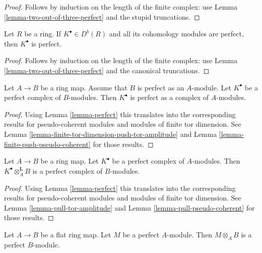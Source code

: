 \begin{proof}
Follows by induction on the length of the finite complex: use
Lemma \ref{lemma-two-out-of-three-perfect}
and the stupid truncations.
\end{proof}

\begin{lemma}
\label{lemma-cohomology-perfect}
Let $R$ be a ring. If $K^\bullet \in D^b(R)$ and all its cohomology
modules are perfect, then $K^\bullet$ is perfect.
\end{lemma}

\begin{proof}
Follows by induction on the length of the finite complex: use
Lemma \ref{lemma-two-out-of-three-perfect}
and the canonical truncations.
\end{proof}

\begin{lemma}
\label{lemma-perfect-push-perfect}
Let $A \to B$ be a ring map. Assume that $B$ is perfect as
an $A$-module. Let $K^\bullet$ be a perfect complex of $B$-modules.
Then $K^\bullet$ is perfect as a complex of $A$-modules.
\end{lemma}

\begin{proof}
Using
Lemma \ref{lemma-perfect}
this translates into the corresponding results for pseudo-coherent modules
and modules of finite tor dimension. See
Lemma \ref{lemma-finite-tor-dimension-push-tor-amplitude}
and
Lemma \ref{lemma-finite-push-pseudo-coherent}
for those results.
\end{proof}

\begin{lemma}
\label{lemma-pull-perfect}
Let $A \to B$ be a ring map.
Let $K^\bullet$ be a perfect
complex of $A$-modules. Then $K^\bullet \otimes_A^{\mathbf{L}} B$
is a perfect complex of $B$-modules.
\end{lemma}

\begin{proof}
Using
Lemma \ref{lemma-perfect}
this translates into the corresponding results for pseudo-coherent modules
and modules of finite tor dimension. See
Lemma \ref{lemma-pull-tor-amplitude}
and
Lemma \ref{lemma-pull-pseudo-coherent}
for those results.
\end{proof}

\begin{lemma}
\label{lemma-flat-base-change-perfect}
Let $A \to B$ be a flat ring map. Let $M$ be a perfect $A$-module.
Then $M \otimes_A B$ is a perfect $B$-module.
\end{lemma}

